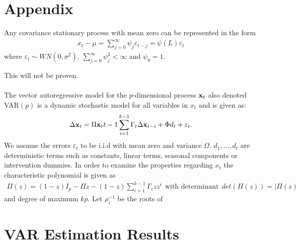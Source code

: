 \chapter{Appendix}
\begin{setn}[Appendix]\label{setn:Wold}
    Any covariance stationary process with mean zero can be represented in the form
    \begin{align*}
        x_t-\mu=\sum^\infty_{j=0}\psi_j\varepsilon_{t-j}=\psi(L)\varepsilon_t
    \end{align*}
    where $\varepsilon_t\sim WN(0,\sigma^2)$, $\sum^\infty_{j=0}\psi^2_j<\infty$ and $\psi_0=1$.
\end{setn}
This will not be proven.\\\\
The vector autoregressive model for the $p$-dimensional process $\textbf{x}_t$ also denoted VAR$(p)$ is a dynamic stochastic model for all variables in $x_t$ and is given as:
\begin{align*}
    \Delta\textbf{x}_t=\Pi\textbf{x}_t{t-1}\sum^{k-1}_{i=1}\Gamma_t\Delta\textbf{x}_{t-i}+\Phi d_t+\varepsilon_t.
\end{align*}
We assume the errors $\varepsilon_t$ to be i.i.d with mean zero and variance $\Omega$. $d_1,\ldots,d_t$ are deterministic terms such as constants, linear terms, seasonal components or intervention dummies. In order to examine the properties regarding $x_t$ the characteristic polynomial is given as
\begin{align*}
    \Pi(z)=(1-z)I_p-\Pi z-(1-z)\sum^{k-1}_{i=1}\Gamma_iz z^i \:\:\text{with determinant}\:\: det(\Pi(z))=|\Pi(z)
\end{align*}
and degree of maximum $kp$. Let $\rho_i^{-1}$ be the roots of\\
\pause





\chapter{VAR Estimation Results}\label{app:Var_estimations}

